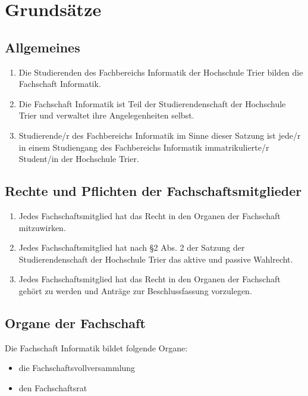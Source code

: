 \section{Grundsätze}

\subsection{Allgemeines}
\begin{enumerate}
\item Die Studierenden des Fachbereichs Informatik der Hochschule Trier bilden die Fachschaft Informatik.
\item Die Fachschaft Informatik ist Teil der Studierendenschaft der Hochschule Trier und verwaltet ihre Angelegenheiten selbst.
\item Studierende/r des Fachbereichs Informatik im Sinne dieser Satzung ist jede/r in einem Studiengang des Fachbereichs Informatik immatrikulierte/r Student/in der Hochschule Trier.
\end{enumerate}

\subsection{Rechte und Pflichten der Fachschaftsmitglieder}
\begin{enumerate}
\item Jedes Fachschaftsmitglied hat das Recht in den Organen der Fachschaft mitzuwirken.
\item Jedes Fachschaftsmitglied hat nach \S 2 Abs. 2 der Satzung der Studierendenschaft der Hochschule Trier das aktive und passive Wahlrecht.
\item Jedes Fachschaftsmitglied hat das Recht in den Organen der Fachschaft gehört zu werden und Anträge zur Beschlussfassung vorzulegen.
\end{enumerate}

\subsection{Organe der Fachschaft}
Die Fachschaft Informatik bildet folgende Organe:
\begin{itemize}
\item die Fachschaftsvollversammlung
\item den Fachschaftsrat
\end{itemize}
